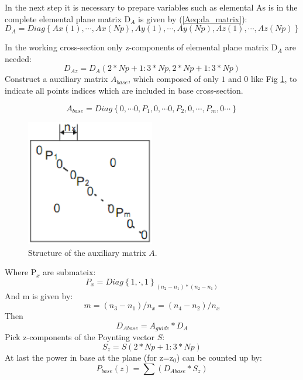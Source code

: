 In the next step it is necessary to prepare variables such as elemental 
As is in \cite{script_FeldSim} the complete elemental plane matrix D$_{A}$ is given by (\ref{Aeq:da_matrix}): 
\begin{equation}
D_{A}=Diag\left\{Ax(1),\cdots,Ax(Np),Ay(1),\cdots,Ay(Np), Az(1),\cdots,Az(Np)\right\}
\label{Aeq:da_matrix}
\end{equation}

In the working cross-section only z-components of elemental plane matrix D$_{A}$ are needed:
\begin{equation}
D_{Az}=D_{A}(2*Np+1:3*Np, 2*Np+1:3*Np)
\label{Aeq:daz_matrix}
\end{equation}
Construct a auxiliary matrix $A_{base}$, which composed of only $1$ and $0$ like Fig \ref{Afig:app_Auxiliary_matrix}, to indicate all points indices which are included in base cross-section. 

\begin{equation}
A_{base}=Diag\left\{0,\cdots 0,P_{1},0,\cdots 0, P_{2}, 0,\cdots, P_{m}, 0\cdots\right\}
\label{Aeq:A_matrix}
\end{equation}

\begin{figure}[!ht]
\centering
\includegraphics[width=0.5\textwidth]{bilder/app_Auxiliary_matrix}
\caption{Structure of the auxiliary matrix $A$.}
\label{Afig:app_Auxiliary_matrix}
\end{figure}
Where P$_{x}$ are submateix:
\begin{equation}
P_{x}=Diag\left\{1,\cdot,1\right\}_{(n_{2}-n_{1})*(n_{2}-n_{1})}
\end{equation}
And m is given by:
\begin{equation}
m=(n_{3}-n_{1})/n_{x}=(n_{4}-n_{2})/n_{x}
\end{equation}
Then 
\begin{equation}
D_{Abase}=A_{guide}*D_{A}
\end{equation}
Pick z-components of the Poynting vector $S$:
\begin{equation}
S_{z}=S(2*Np+1:3*Np)
\end{equation}
At last the power in base at the plane (for z=z$_{0}$) can be counted up by:
\begin{equation}
P_{base}(z)=\sum(D_{Abase}*S_{z})
\end{equation}

